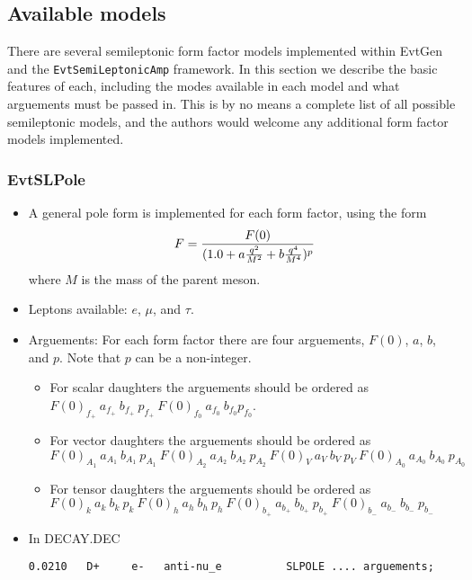 \documentclass[6pt]{article}
\begin{document}
\subsection{Available models}
\label{sec:models}
\noindent There are several semileptonic form factor models
implemented within EvtGen and the {\tt EvtSemiLeptonicAmp} 
framework.  In this section we describe the basic features of
each, including the modes available in each model and what
arguements must be passed in.  This is by no means a complete
list of all possible semileptonic models, and the authors would
welcome any additional form factor models implemented.

\subsubsection{EvtSLPole}
\label{sect:EvtSLPole}
\begin{itemize} 
\item A general pole form is implemented for each form factor, using
the form
\begin{equation}
F = { {F(0)} \over { (1.0 + a { {q^2} \over {M^2} } + b { {q^4} \over {M^4} })^p}}
\end{equation}
where $M$ is the mass of the parent meson. 
\item Leptons available: $e$, $\mu$, and $\tau$.
\item Arguements: For each form factor there are four arguements, $F(0)$,
$a$, $b$, and $p$.  Note that $p$ can be a non-integer.  
\begin{itemize}
\item For scalar daughters the arguements should be ordered
as \\
$F(0)_{f_+}~ a_{f_+}~ b_{f_+}~ p_{f_+}~ F(0)_{f_0}~ a_{f_0}~ b_{f_0}p_{f_0}$.
\item For vector daughters the arguements should be ordered
as \\
$F(0)_{A_1}~ a_{A_1}~ b_{A_1}~p_{A_1}~F(0)_{A_2}~ a_{A_2}~ b_{A_2}~p_{A_2}~
F(0)_{V}~ a_{V}~ b_{V}~ p_{V}~
F(0)_{A_0}~ a_{A_0}~ b_{A_0}~p_{A_0}$
\item For tensor daughters the arguements should be ordered
as  \\ 
$F(0)_{k}~ a_{k}~ b_{k}~p_{k}~F(0)_{h}~ a_{h}~ b_{h}~p_{h}~F(0)_{b_+}~ a_{b_+}~ b_{b_+}~
p_{b_+}~F(0)_{b_-}~ a_{b_-}~ b_{b_-}~p_{b_-}$
\end{itemize}
\item In DECAY.DEC
\begin{verbatim}
0.0210   D+     e-   anti-nu_e          SLPOLE .... arguements;
\end{verbatim}
\end{itemize}
\end{document}
